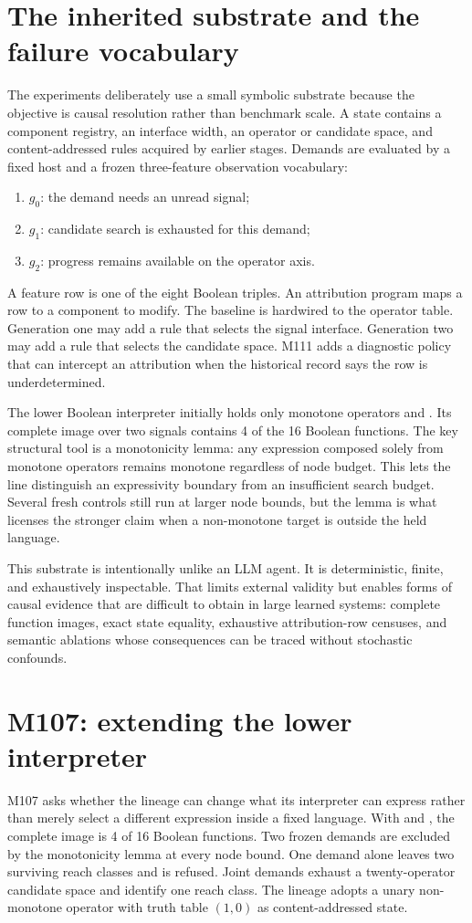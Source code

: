 \section{The inherited substrate and the failure vocabulary}
\label{sec:mechanism}
The experiments deliberately use a small symbolic substrate because the objective is causal resolution rather than benchmark scale. A state contains a component registry, an interface width, an operator or candidate space, and content-addressed rules acquired by earlier stages. Demands are evaluated by a fixed host and a frozen three-feature observation vocabulary:
\begin{enumerate}
  \item $g_0$: the demand needs an unread signal;
  \item $g_1$: candidate search is exhausted for this demand;
  \item $g_2$: progress remains available on the operator axis.
\end{enumerate}
A feature row is one of the eight Boolean triples. An attribution program maps a row to a component to modify. The baseline \mzero is hardwired to the operator table. Generation one may add a rule that selects the signal interface. Generation two may add a rule that selects the candidate space. M111 adds a diagnostic policy that can intercept an attribution when the historical record says the row is underdetermined.

The lower Boolean interpreter initially holds only monotone operators  and . Its complete image over two signals contains 4 of the 16 Boolean functions. The key structural tool is a monotonicity lemma: any expression composed solely from monotone operators remains monotone regardless of node budget. This lets the line distinguish an expressivity boundary from an insufficient search budget. Several fresh controls still run at larger node bounds, but the lemma is what licenses the stronger claim when a non-monotone target is outside the held language.

This substrate is intentionally unlike an LLM agent. It is deterministic, finite, and exhaustively inspectable. That limits external validity but enables forms of causal evidence that are difficult to obtain in large learned systems: complete function images, exact state equality, exhaustive attribution-row censuses, and semantic ablations whose consequences can be traced without stochastic confounds.

\section{M107: extending the lower interpreter}
\label{sec:m107}
M107 asks whether the lineage can change what its interpreter can express rather than merely select a different expression inside a fixed language. With  and , the complete image is 4 of 16 Boolean functions. Two frozen demands are excluded by the monotonicity lemma at every node bound. One demand alone leaves two surviving reach classes and is refused. Joint demands exhaust a twenty-operator candidate space and identify one reach class. The lineage adopts a unary non-monotone operator with truth table $(1,0)$ as content-addressed state.

